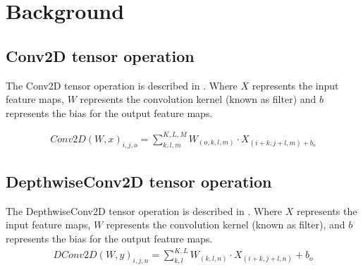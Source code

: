 \section{Background}
\label{sec:background}
\subsection{Conv2D tensor operation}
The Conv2D tensor operation is described in . Where $X$ represents the input feature maps, $W$ represents the convolution kernel (known as filter) and $b$ represents the bias for the output feature maps\cite{goodfellow2016deep}.

 	\begin{eqnarray} \label{eq:conv2D}
 	Conv2D\left(W,x\right)_{i,j,o}=\sum_{k,l,m}^{K,L,M}W_{(o,k,l,m)} \cdot X_{(i+k,j+l,m)+b_{o}}
 	\end{eqnarray} 	
 	
\subsection{DepthwiseConv2D tensor operation}
The DepthwiseConv2D tensor operation is described in . Where $X$ represents the input feature maps, $W$ represents the convolution kernel (known as filter), and $b$ represents the bias for the output feature maps.
 	\begin{eqnarray} \label{eq:dconv2D}
 	DConv2D\left(W,y\right)_{i,j,n}=\sum_{k,l}^{K,L}W_{(k,l,n)} \cdot X_{(i+k,j+l,n)}+b_{o}
 	\end{eqnarray}